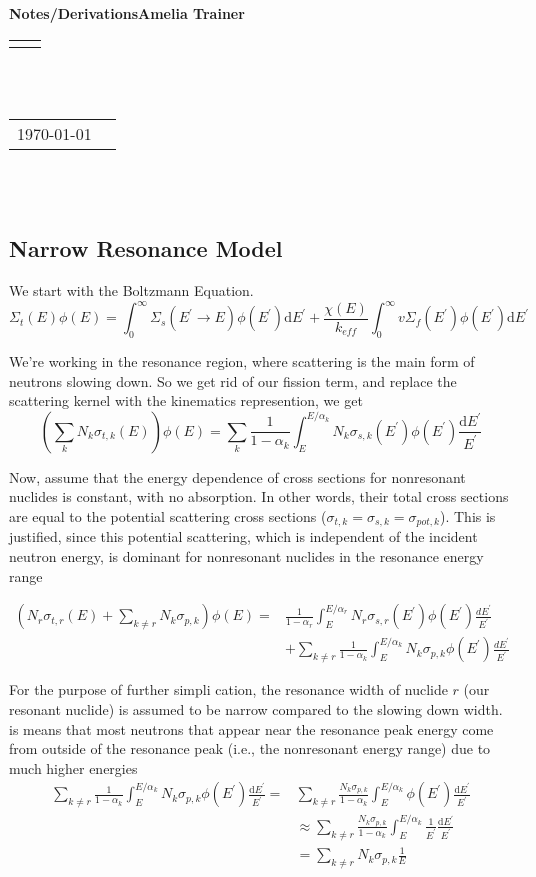 \documentclass[10pt]{article}
\renewcommand{\title}[1]{\textbf{#1}\\}
\renewcommand{\line}{\begin{tabularx}{\textwidth}{X>{\raggedleft}X}\hline\\\end{tabularx}\\[-0.5cm]}
\newcommand{\leftright}[2]{\begin{tabularx}{\textwidth}{X>{\raggedleft}X}#1%
\end{tabularx}\\[-0.5cm]}
\begin{document}
\title{Notes/Derivations\qquad Amelia Trainer }
\line\\
\leftright{\today}{ }%
~\par

\subsection*{Narrow Resonance Model}
We start with the Boltzmann Equation.
\[\Sigma_{t}(E)\phi(E)=\int_{0}^{\infty}\Sigma_{s}\left(E^{\prime}\rightarrow E\right)\phi\left(E^{\prime}\right)\mathrm{d}E^{\prime}+\frac{\chi(E)}{k_{eff}}\int_{0}^{\infty}v\Sigma_{f}\left(E^{\prime}\right)\phi\left(E^{\prime}\right)\mathrm{d}E^{\prime}\]

We're working in the resonance region, where scattering is the main form of neutrons slowing down. So we get rid of our fission term, and replace the scattering kernel with the kinematics represention, we get
\[\left(\sum_{k}N_{k}\sigma_{t,k}(E)\right)\phi(E)=\sum_{k}\frac{1}{1-\alpha_{k}}\int_{E}^{E/\alpha_{k}}N_{k}\sigma_{s,k}\left(E^{\prime}\right)\phi\left(E^{\prime}\right)\frac{\mathrm{d}E^{\prime}}{E^{\prime}}\]

Now, assume that the energy dependence of cross sections for nonresonant nuclides is constant, with no absorption. In other words, their total cross sections are equal to the potential scattering cross sections ($\sigma_{t,k}=\sigma_{s,k}=\sigma_{pot,k}$). This is justified, since this potential scattering, which is independent of the incident neutron energy, is dominant for nonresonant nuclides in the resonance energy range

\[\begin{aligned}\left(N_{r}\sigma_{t,r}(E)+\sum_{k\neq r}N_{k}\sigma_{p,k}\right)\phi(E)=&\frac{1}{1-\alpha_{r}}\int_{E}^{E/\alpha_{r}}N_{r}\sigma_{s,r}\left(E^{\prime}\right)\phi\left(E^{\prime}\right)\frac{dE^{\prime}}{E^{\prime}}\\&+\sum_{k\neq r}\frac{1}{1-\alpha_{k}}\int_{E}^{E/\alpha_{k}}N_{k}\sigma_{p,k}\phi\left(E^{\prime}\right)\frac{dE^{\prime}}{E^{\prime}}\end{aligned}\]
  

  For the purpose of further simpli cation, the resonance width of nuclide $r$ (our resonant nuclide) is assumed to be narrow compared to the slowing down width.  is means that most neutrons that appear near the resonance peak energy come from outside of the resonance peak (i.e., the nonresonant energy range) due to much higher energies
\begin{align*}\sum_{k\neq r}\frac{1}{1-\alpha_{k}}\int_{E}^{E/\alpha_{k}}N_{k}\sigma_{p,k}\phi\left(E^{\prime}\right)\frac{\mathrm{d}E^{\prime}}{E^{\prime}}=&\sum_{k\neq r}\frac{N_{k}\sigma_{p,k}}{1-\alpha_{k}}\int_{E}^{E/\alpha_{k}}\phi\left(E^{\prime}\right)\frac{\mathrm{d}E^{\prime}}{E^{\prime}}\\&{\approx\sum_{k\neq r}\frac{N_{k}\sigma_{p,k}}{1-\alpha_{k}}\int_{E}^{E/\alpha_{k}}\frac{1}{E^{\prime}}\frac{\mathrm{d}E^{\prime}}{E^{\prime}}}\\ &=\sum_{k\neq r}N_{k}\sigma_{p,k}\frac{1}{E}\end{align*}
\end{document}

